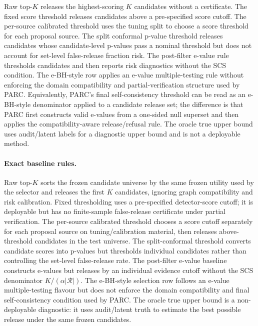 \documentclass[11pt]{article}
\newcommand{\Rcal}{\mathcal R}
\begin{document}
Raw top-\(K\) releases the highest-scoring \(K\) candidates without a certificate.
The fixed score threshold releases candidates above a pre-specified score cutoff.
The per-source calibrated threshold uses the tuning split to choose a score threshold for each proposal source.
The split conformal p-value threshold releases candidates whose candidate-level p-values pass a nominal threshold but does not account for set-level false-release fraction risk.
The post-filter e-value rule thresholds candidates and then reports risk diagnostics without the SCS condition.
The e-BH-style row applies an e-value multiple-testing rule without enforcing the domain compatibility and partial-verification structure used by PARC.
Equivalently, PARC's final self-consistency threshold can be read as an e-BH-style denominator applied to a candidate release set; the difference is that PARC first constructs valid e-values from a one-sided null superset and then applies the compatibility-aware release/refusal rule.
The oracle true upper bound uses audit/latent labels for a diagnostic upper bound and is not a deployable method.

\paragraph{Exact baseline rules.}
Raw top-\(K\) sorts the frozen candidate universe by the same frozen utility used by the selector and releases the first \(K\) candidates, ignoring graph compatibility and risk calibration.
Fixed thresholding uses a pre-specified detector-score cutoff; it is deployable but has no finite-sample false-release certificate under partial verification.
The per-source calibrated threshold chooses a score cutoff separately for each proposal source on tuning/calibration material, then releases above-threshold candidates in the test universe.
The split-conformal threshold converts candidate scores into p-values but thresholds individual candidates rather than controlling the set-level false-release rate.
The post-filter e-value baseline constructs e-values but releases by an individual evidence cutoff without the SCS denominator \(K/(\alpha|\Rcal|)\).
The e-BH-style selection row follows an e-value multiple-testing flavour but does not enforce the domain compatibility and final self-consistency condition used by PARC.
The oracle true upper bound is a non-deployable diagnostic: it uses audit/latent truth to estimate the best possible release under the same frozen candidates.
\end{document}

